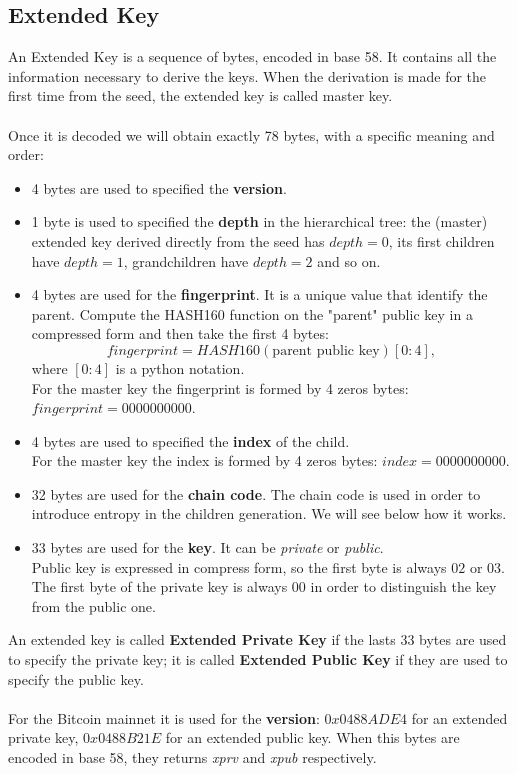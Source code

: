 \subsection{Extended Key}
An Extended Key is a sequence of bytes, encoded in base 58. It contains all the information necessary to derive the keys. When the derivation is made for the first time from the seed, the extended key is called master key.\\ \\
Once it is decoded we will obtain exactly 78 bytes, with a specific meaning and order:
\begin{itemize}[label=$\circledast$]
	\item 4 bytes are used to specified the \textbf{version}.
	\item 1 byte is used to specified the \textbf{depth} in the hierarchical tree: the (master) extended key derived directly from the seed has $depth=0$, its first children have $depth=1$, grandchildren have $depth=2$ and so on.
	\item 4 bytes are used for the \textbf{fingerprint}. It is a unique value that identify the parent. Compute the HASH160 function on the "parent" public key in a compressed form and then take the first 4 bytes:
	\begin{equation*}
	fingerprint=HASH160(\text{parent public key})[0:4],
	\end{equation*}
	where $[0:4]$ is a python notation.\\
	For the master key the fingerprint is formed by 4 zeros bytes: $fingerprint=0000000000$.
	\item 4 bytes are used to specified the \textbf{index} of the child. \\
	For the master key the index is formed by 4 zeros bytes: $index=0000000000$.
	\item 32 bytes are used for the \textbf{chain code}. The chain code is used in order to introduce entropy in the children generation. We will see below how it works.
	\item 33 bytes are used for the \textbf{key}. It can be \textit{private} or \textit{public}. \\ Public key is expressed in compress form, so the first byte is always $02$ or $03$. The first byte of the private key is always $00$ in order to distinguish the key from the public one.\\
\end{itemize}
An extended key is called \textbf{Extended Private Key} if the lasts 33 bytes are used to specify the private key; it is called \textbf{Extended Public Key} if they are used to specify the public key.
\\ \\
For the Bitcoin mainnet it is used for the \textbf{version}: $0x0488ADE4$ for an extended private key, $0x0488B21E$ for an extended public key. When this bytes are encoded in base 58, they returns \textit{xprv} and \textit{xpub} respectively.

